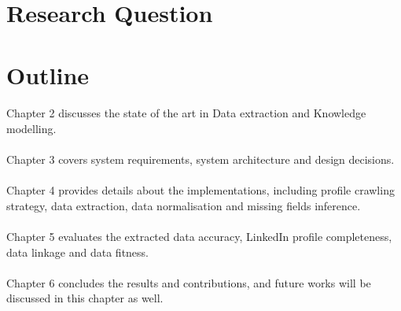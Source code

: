 %
%

\section{Research Question}

\section{Outline}
\paragraph{}
Chapter 2 discusses the state of the art in Data extraction and Knowledge modelling.
\paragraph{}
Chapter 3 covers system requirements, system architecture and design decisions.
\paragraph{}
Chapter 4 provides details about the implementations, including profile crawling strategy, data extraction, data normalisation and missing fields inference.
\paragraph{}
Chapter 5 evaluates the extracted data accuracy, LinkedIn profile completeness, data linkage and data fitness.
\paragraph{}
Chapter 6 concludes the results and contributions, and future works will be discussed in this chapter as well.
